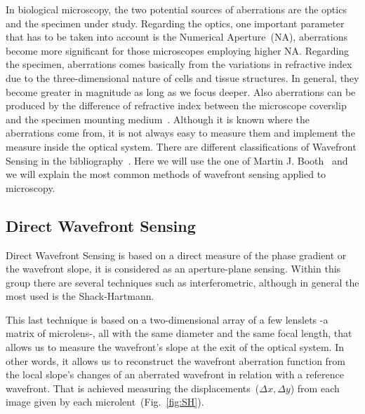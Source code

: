 In biological microscopy, the two potential sources of aberrations are the optics and the specimen under study. Regarding the optics, one important parameter that has to be taken into account is the Numerical Aperture~(NA), aberrations become more significant for those microscopes employing higher NA. Regarding the specimen, aberrations comes basically from the variations in refractive index due to the three-dimensional nature of cells and tissue structures. In general, they become greater in magnitude as long as we focus deeper. Also aberrations can be produced by the difference of refractive index between the microscope coverslip and the specimen mounting medium~\cite{AOM_basic_ref}. 
Although it is known where the aberrations come from, it is not always easy to measure them and implement the measure inside the optical system. There are different classifications of Wavefront Sensing in the bibliography~\cite{AO_engineering_handbook}. Here we will use the one of Martin J. Booth~\cite{AOM_basic_ref} and we will explain the most common methods of wavefront sensing applied to microscopy.      


\subsection{Direct Wavefront Sensing}
\label{sec:WavefrontSensing}
Direct Wavefront Sensing is based on a direct measure of the phase gradient or the wavefront slope, it is considered as an aperture-plane sensing. Within this group there are several techniques such as interferometric, although in general the most used is the Shack-Hartmann. 


This last technique is based on a two-dimensional array of a few lenslets -a matrix of microlens-, all with the same diameter and the same focal length, that allows us to measure the wavefront's slope at the exit of the optical system. In other words, it allows us to reconstruct the wavefront aberration function from the local slope's changes of an aberrated wavefront in relation with a reference wavefront. That is achieved measuring the displacements~($\Delta x, \Delta y$) from each image given by each microlent~(Fig.~\ref{fig:SH}).

